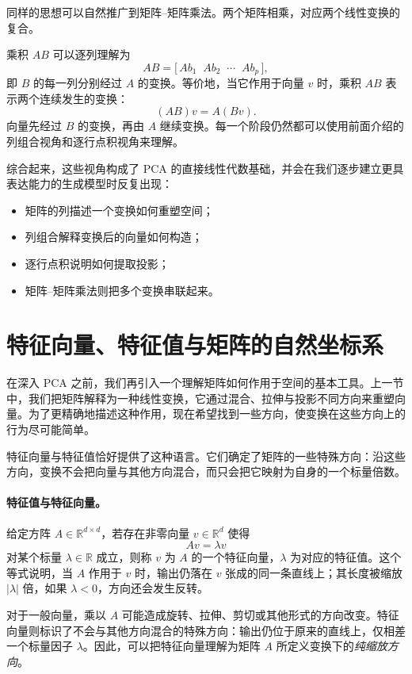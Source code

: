 同样的思想可以自然推广到矩阵--矩阵乘法。两个矩阵相乘，对应两个线性变换的复合。

乘积 \(AB\) 可以逐列理解为
\[
AB =
\big[\,A b_1 \;\; A b_2 \;\; \cdots \;\; A b_p\,\big],
\]
即 \(B\) 的每一列分别经过 \(A\) 的变换。等价地，当它作用于向量 \(v\) 时，乘积 \(AB\) 表示两个连续发生的变换：
\[
(AB)v = A(Bv).
\]
向量先经过 \(B\) 的变换，再由 \(A\) 继续变换。每一个阶段仍然都可以使用前面介绍的列组合视角和逐行点积视角来理解。

\medskip
\noindent
综合起来，这些视角构成了 PCA 的直接线性代数基础，并会在我们逐步建立更具表达能力的生成模型时反复出现：
\begin{itemize}
\item 矩阵的列描述一个变换如何重塑空间；
\item 列组合解释变换后的向量如何构造；
\item 逐行点积说明如何提取投影；
\item 矩阵--矩阵乘法则把多个变换串联起来。
\end{itemize}

\section{特征向量、特征值与矩阵的自然坐标系}
在深入 PCA 之前，我们再引入一个理解矩阵如何作用于空间的基本工具。上一节中，我们把矩阵解释为一种线性变换，它通过混合、拉伸与投影不同方向来重塑向量。为了更精确地描述这种作用，现在希望找到一些方向，使变换在这些方向上的行为尽可能简单。

特征向量与特征值恰好提供了这种语言。它们确定了矩阵的一些特殊方向：沿这些方向，变换不会把向量与其他方向混合，而只会把它映射为自身的一个标量倍数。

\paragraph{特征值与特征向量。}
给定方阵 \(A \in \mathbb{R}^{d \times d}\)，若存在非零向量 \(v \in \mathbb{R}^d\) 使得
\[
A v = \lambda v
\]
对某个标量 \(\lambda \in \mathbb{R}\) 成立，则称 \(v\) 为 \(A\) 的一个特征向量，\(\lambda\) 为对应的特征值。这个等式说明，当 \(A\) 作用于 \(v\) 时，输出仍落在 \(v\) 张成的同一条直线上；其长度被缩放 \(|\lambda|\) 倍，如果 \(\lambda<0\)，方向还会发生反转。

对于一般向量，乘以 \(A\) 可能造成旋转、拉伸、剪切或其他形式的方向改变。特征向量则标识了不会与其他方向混合的特殊方向：输出仍位于原来的直线上，仅相差一个标量因子 \(\lambda\)。因此，可以把特征向量理解为矩阵 \(A\) 所定义变换下的\emph{纯缩放方向}。

